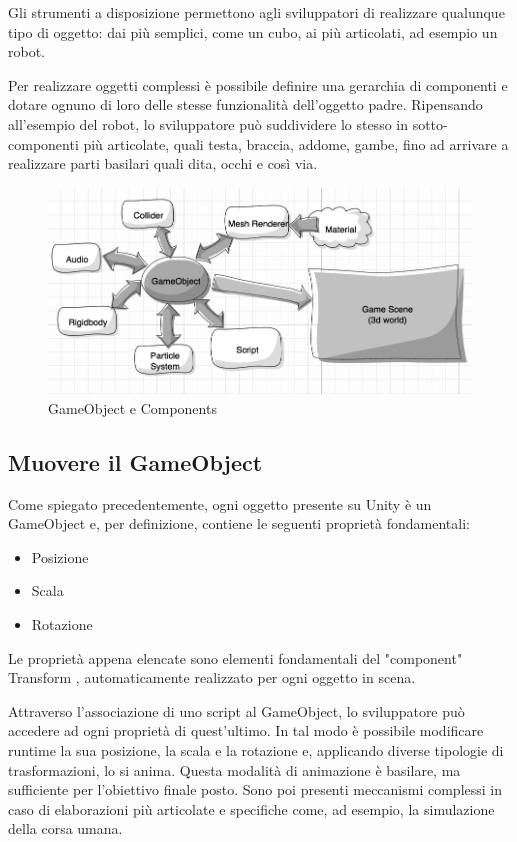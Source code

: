 Gli strumenti a disposizione permettono agli sviluppatori di realizzare qualunque tipo di oggetto: dai più semplici, come un cubo, ai più articolati, ad esempio un robot. 

\medskip

Per realizzare oggetti complessi è possibile definire una gerarchia di componenti e dotare ognuno di loro delle stesse funzionalità dell'oggetto padre. Ripensando all'esempio del robot, lo sviluppatore può suddividere lo stesso in sotto-componenti più articolate, quali testa, braccia, addome, gambe, fino ad arrivare a realizzare parti basilari quali dita, occhi e così via.

\begin{figure}[H]
\centering
\includegraphics[width=\textwidth]{figures/unity_diagram.png}
\caption{GameObject e Components}
\end{figure}

\subsection{Muovere il GameObject}

Come spiegato precedentemente, ogni oggetto presente su Unity è un GameObject e, per definizione, contiene le seguenti proprietà fondamentali: 
\begin{itemize}
    \item Posizione
    \item Scala
    \item Rotazione
\end{itemize}
Le proprietà appena elencate sono elementi fondamentali del "component" Transform \cite{unity_transform}, automaticamente realizzato per ogni oggetto in scena.

\medskip

Attraverso l'associazione di uno script al GameObject, lo sviluppatore può accedere ad ogni proprietà di quest'ultimo. In tal modo è possibile modificare runtime la sua posizione, la scala e la rotazione e, applicando diverse tipologie di trasformazioni, lo si anima. Questa modalità di animazione è basilare, ma sufficiente per l'obiettivo finale posto. Sono poi presenti meccanismi complessi in caso di elaborazioni più articolate e specifiche come, ad esempio, la simulazione della corsa umana.

